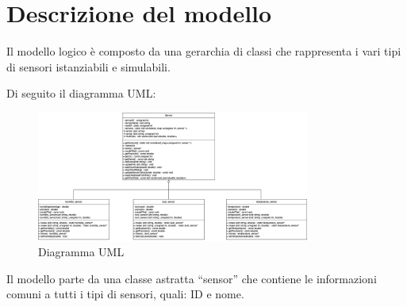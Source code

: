\documentclass{article}
\begin{document}
    \section{Descrizione del modello}
    Il modello logico è composto da una gerarchia di classi che rappresenta i vari tipi di sensori istanziabili e simulabili. 
        
    Di seguito il diagramma UML:    
    \begin{figure}[h!]
        \centering
        \includegraphics[width=0.8\textwidth]{UML.png}
        \caption*{Diagramma UML}
    \end{figure}
    
    \newpage
    \noindent Il modello parte da una classe astratta “sensor” che contiene le informazioni comuni a tutti i tipi di sensori, quali: ID e nome.
    
\end{document}
